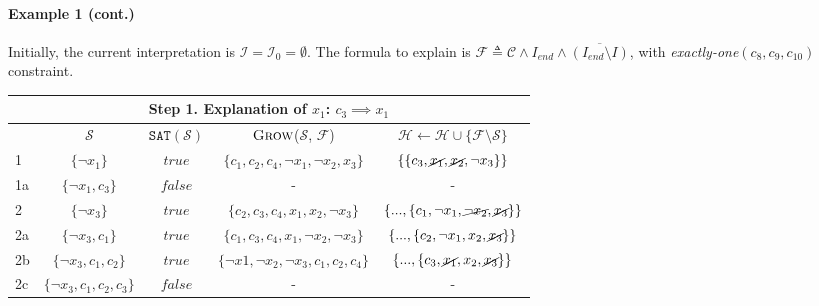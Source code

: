 \documentclass[twoside,11pt]{article}
\newcommand\m[1]{\mathcal{#1}}
\newcommand\setstohit{\ensuremath{\m{H} }\xspace}
\newcommand\Iend{\ensuremath{I_\mathit{end} }\xspace}
\newcommand\formula{\ensuremath{\m{F} }\xspace}
\newcommand\formulac{\ensuremath{\m{C} }\xspace}
\newcommand\mm[1]{\ensuremath{#1}\xspace}
\newcommand\call[1]{\mm{\textsc{#1}}}
\newcommand\sat{\texttt{{SAT}}\xspace}
\newcommand\grow{\mm{\call{Grow}}}
\begin{document}
\paragraph{Example 1 (cont.)} Initially, the current interpretation is $\m{I} = \m{I}_0 = \emptyset$. The formula to explain is $\formula \triangleq \formulac \wedge \Iend \wedge \overline{(\Iend\setminus I)}$, with \textit{exactly-one$(c_8, c_9, c_{10})$} constraint. 


\begin{table}[!h]
\centering
\begin{tabular}{lcccc} 
	\multicolumn{5}{c}{Step 1. Explanation of $x_1$: $c_3 \implies x_1$}\\
	\toprule
						 & $\m{S}$                             & $\sat(\m{S})$    & \grow($\m{S}$, $\formula$)                             & $\setstohit  \gets \setstohit  \cup \{  \formula \setminus \m{S}\}$     \\ 
	\toprule[2pt]
	1                    & $\{ \lnot x_1\}$                    & $\mathit{true}$  & $\{c_1, c_2, c_4, \lnot x_1, \lnot x_2, x_3 \}$        & $\{ \{c_3, \cancel{x_1}, \cancel{x_2}, \lnot x_3 \}\}$                  \\
	\midrule[0.5pt]
	1a                   & $\{ \lnot x_1, c_3 \}$              & $\mathit{false}$ & -                                                      & -                                                                       \\
	\midrule[1pt]
	2                    & $\{\lnot x_3\}$                     & $\mathit{true}$  & $\{c_2, c_3,c_4, x_1, x_2 , \lnot x_3 \}$              & $\{ ..., \{ c_1, \lnot x_1, \cancel{\lnot x_2}, \cancel{x_3} \}\}$      \\  
	\midrule[0.5pt]
	2a                   & $\{\lnot x_3, c_1\} $               & $\mathit{true}$  & $\{c_1, c_3, c_4, x_1, \lnot x_2, \lnot x_3\}$         & $\{  ..., \{c_2, {\lnot x_1} , {x_2}, \cancel{x_3} \} \}$               \\
	\midrule[0.5pt]
	2b                   & $\{\lnot x_3, c_1, c_2\} $          & $\mathit{true}$  & $\{ \lnot x1, \lnot x_2, \lnot x_3, c_1,  c_2 , c_4\}$ & $\{ ..., \{ c_3, \cancel{x_1}, {x_2}, \cancel{x_3}\} \}$                \\
	\midrule[0.5pt]
	2c                   & $\{\lnot x_3, c_1, c_2, c_3\} $     & $\mathit{false}$ & -                                                      & -                                                                       \\ 

\end{tabular}
\end{table}
\end{document}
